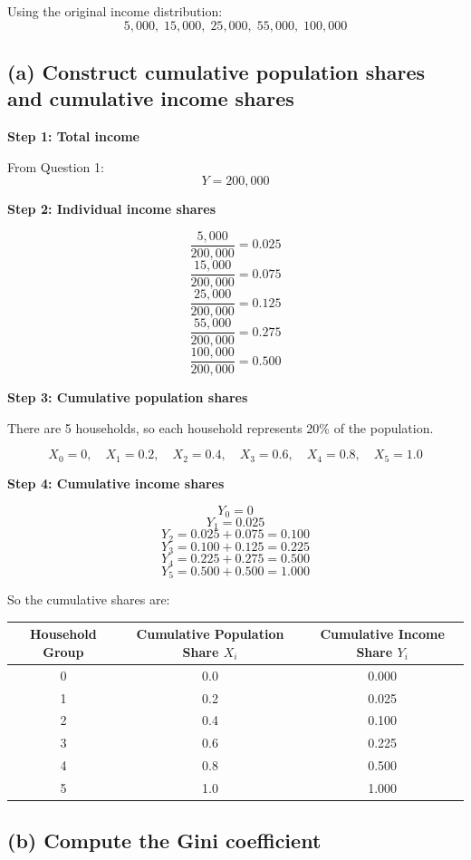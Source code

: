 \documentclass[12pt]{article}
\begin{document}
Using the original income distribution:
\[
5{,}000,\; 15{,}000,\; 25{,}000,\; 55{,}000,\; 100{,}000
\]

\subsection*{(a) Construct cumulative population shares and cumulative income shares}

\textbf{Step 1: Total income}

From Question 1:
\[
Y = 200{,}000
\]

\textbf{Step 2: Individual income shares}

\[
\frac{5{,}000}{200{,}000} = 0.025
\]
\[
\frac{15{,}000}{200{,}000} = 0.075
\]
\[
\frac{25{,}000}{200{,}000} = 0.125
\]
\[
\frac{55{,}000}{200{,}000} = 0.275
\]
\[
\frac{100{,}000}{200{,}000} = 0.500
\]

\textbf{Step 3: Cumulative population shares}

There are 5 households, so each household represents 20\% of the population.

\[
X_0 = 0,\quad X_1 = 0.2,\quad X_2 = 0.4,\quad X_3 = 0.6,\quad X_4 = 0.8,\quad X_5 = 1.0
\]

\textbf{Step 4: Cumulative income shares}

\[
Y_0 = 0
\]
\[
Y_1 = 0.025
\]
\[
Y_2 = 0.025 + 0.075 = 0.100
\]
\[
Y_3 = 0.100 + 0.125 = 0.225
\]
\[
Y_4 = 0.225 + 0.275 = 0.500
\]
\[
Y_5 = 0.500 + 0.500 = 1.000
\]

So the cumulative shares are:

\begin{center}
\begin{tabular}{ccc}
\toprule
Household Group & Cumulative Population Share $X_i$ & Cumulative Income Share $Y_i$ \\
\midrule
0 & 0.0 & 0.000 \\
1 & 0.2 & 0.025 \\
2 & 0.4 & 0.100 \\
3 & 0.6 & 0.225 \\
4 & 0.8 & 0.500 \\
5 & 1.0 & 1.000 \\
\bottomrule
\end{tabular}
\end{center}

\subsection*{(b) Compute the Gini coefficient}
\end{document}
